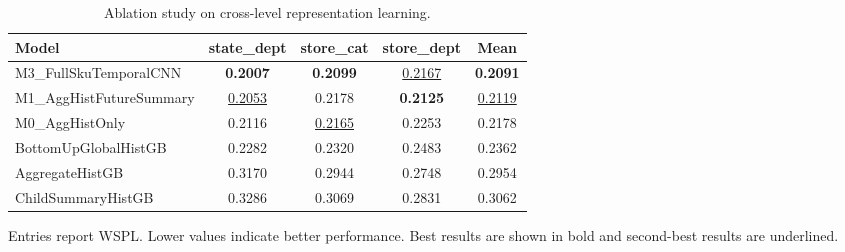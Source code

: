 \begin{table}[H]
\centering
\caption{Ablation study on cross-level representation learning.}
\label{tab:ablation}
\begin{threeparttable}
\begin{tabular}{lcccc}
\toprule
Model & state\_dept & store\_cat & store\_dept & Mean \\
\midrule
M3\_FullSkuTemporalCNN & \textbf{0.2007} & \textbf{0.2099} & \underline{0.2167} & \textbf{0.2091} \\
M1\_AggHistFutureSummary & \underline{0.2053} & 0.2178 & \textbf{0.2125} & \underline{0.2119} \\
M0\_AggHistOnly & 0.2116 & \underline{0.2165} & 0.2253 & 0.2178 \\
BottomUpGlobalHistGB & 0.2282 & 0.2320 & 0.2483 & 0.2362 \\
AggregateHistGB & 0.3170 & 0.2944 & 0.2748 & 0.2954 \\
ChildSummaryHistGB & 0.3286 & 0.3069 & 0.2831 & 0.3062 \\
\bottomrule
\end{tabular}
\begin{tablenotes}
\footnotesize \item Entries report WSPL. Lower values indicate better performance. Best results are shown in bold and second-best results are underlined.
\end{tablenotes}
\end{threeparttable}
\end{table}
